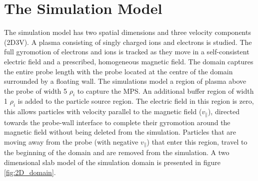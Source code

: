 



%
%
%
\section{The Simulation Model}

The simulation model has two spatial dimensions and three velocity components (2D3V). A plasma consisting of singly charged ions and electrons is studied. The full gyromotion of electrons and ions is tracked as they move in a self-consistent electric field and a prescribed, homogeneous magnetic field. The domain captures the entire probe length with the probe located at the centre of the domain surrounded by a floating wall. The simulations model a region of plasma above the probe of width 5 $\rho_i$ to capture the MPS. An additional buffer region of width 1 $\rho_i$ is added to the particle source region. The electric field in this region is zero, this allows particles with velocity parallel to the magnetic field ($v_{\parallel}$),  directed towards the probe-wall interface to complete their gyromotion around the magnetic field without being deleted from the simulation. Particles that are moving away from the probe (with negative $v_{\parallel}$) that enter this region, travel to the beginning of the domain and are removed from the simulation. A two dimensional slab model of the simulation domain is presented in figure \ref{fig:2D_domain}. 


